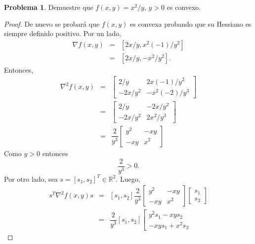 \documentclass[12pt,letterpaper]{article}
\theoremstyle{definition}
\newtheorem{problm}{Problema}
\begin{document}
\begin{problm}
	Demuestre que $ f(x,y) = x^2 / y $, $ y >0 $ es convexo.
	\begin{proof}
		De nuevo se probará que $ f(x,y) $ es convexa probando que su Hessiano es siempre definido positivo. Por un lado,
		\begin{eqnarray*}
			\nabla f(x,y) & = & \left[ 2x/y, x^2 (-1)/y^2 \right] \\
			              & = & \left[ 2x/y, -x^2/y^2 \right].
		\end{eqnarray*}
		Entonces,
		\begin{eqnarray*}
			\nabla^2 f(x,y) & = & \left[\begin{matrix}
										2/y & 2x(-1)/y^2 \\
										-2x/y^2 & -x^2 (-2) / y^3
								  \end{matrix}\right] \\
							& = & \left[\begin{matrix}
									2/y     & -2x/y^2 \\
									-2x/y^2 &2x^2/ y^3
								\end{matrix}\right] \\
							& = & \dfrac{2}{y^3} 
								  \left[\begin{matrix}
								     	y^2     & -xy \\
									  -xy & x^2
								  \end{matrix}\right]
		\end{eqnarray*}
		Como $ y > 0 $ entonces 
		\begin{equation}\label{mayor}
			\dfrac{2}{y^3} > 0 .
		\end{equation}
		Por otro lado, sea $ s = [s_1, s_2]^T \in\mathbb{R}^2 $. Luego,
		\begin{eqnarray*}
			s^T \nabla^2 f(x,y) s & = & [s_1, s_2] \dfrac{2}{y^3} 
										\left[\begin{matrix}
											y^2     & -xy \\
											-xy & x^2
										\end{matrix}\right] 
										\left[\begin{matrix}
											s_1 \\
											s_2
										\end{matrix}\right]	\\
								  & = & \dfrac{2}{y^3} [s_1, s_2]  
										  \left[\begin{matrix}
										  	y^2 s_1 - xy s_2 \\
										  	-xys_1 + x^2 s_2

\end{matrix}
\end{eqnarray*}
\end{proof}
\end{problm}
\end{document}
